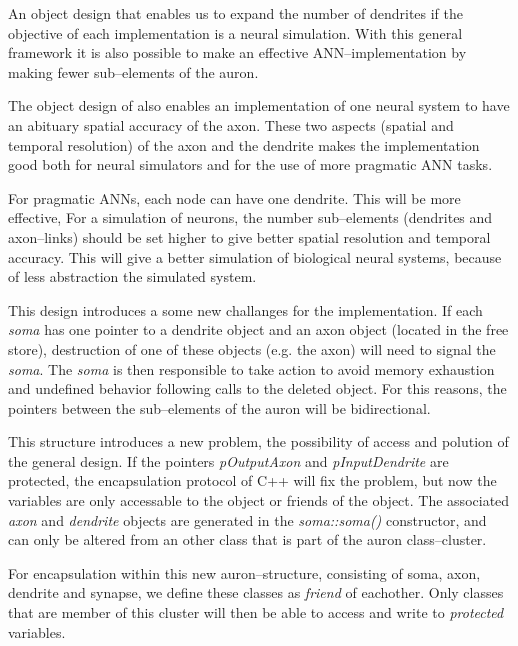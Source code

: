 	An object design that enables us to expand the number of dendrites if the objective of each implementation is a neural simulation. 
	With this general framework it is also possible to make an effective ANN--implementation by making fewer sub--elements of the auron.

	The object design of also enables an implementation of one neural system to have an abituary spatial accuracy of the axon. 
	These two aspects (spatial and temporal resolution) of the axon and the dendrite makes the implementation good both for neural simulators and for the use of more pragmatic ANN tasks.

	For pragmatic ANNs, each node can have one dendrite. This will be more effective,
	For a simulation of neurons, the number sub--elements (dendrites and axon--links) should be set higher to give better spatial resolution and temporal accuracy. 
	This will give a better simulation of biological neural systems, because of less abstraction the simulated system.

	
	This design introduces a some new challanges for the implementation. 
	If each \emph{soma} has one pointer to a dendrite object and an axon object (located in the free store), destruction of one of these objects (e.g. the axon) will need to signal the \emph{soma}. 
	The \emph{soma} is then responsible to take action to avoid memory exhaustion and undefined behavior following calls to the deleted object. %
	For this reasons, the pointers between the sub--elements of the auron will be bidirectional. 

	This structure introduces a new problem, the possibility of access and polution of the general design. 
	If the pointers \emph{pOutputAxon} and \emph{pInputDendrite} are protected, the encapsulation protocol of C++ will fix the problem, but now the variables are only accessable to the object or friends of the object.
	The associated \emph{axon} and \emph{dendrite} objects are generated in the \emph{soma::soma()} constructor, and can only be altered from an other class that is part of the auron class--cluster. %

	For encapsulation within this new auron--structure, consisting of soma, axon, dendrite and synapse, we define these classes as \emph{friend} of eachother. 
	Only classes that are member of this cluster will then be able to access and write to \emph{protected} variables.



